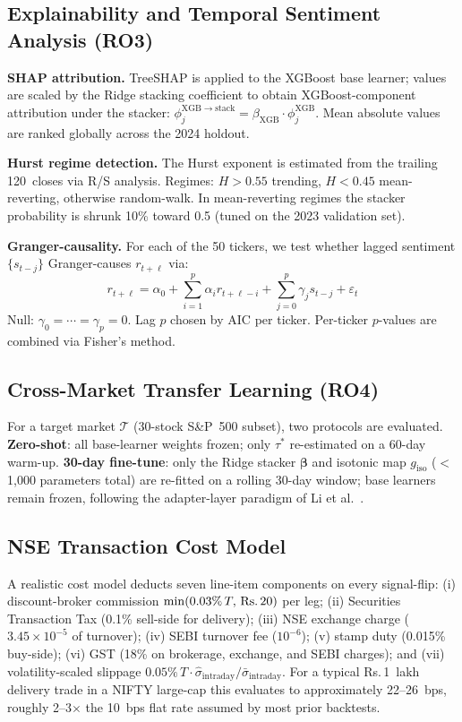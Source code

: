 \documentclass[12pt,a4paper]{article}
\begin{document}
\subsection{Explainability and Temporal Sentiment Analysis (RO3)}

\textbf{SHAP attribution.} TreeSHAP \cite{r20} is applied to the XGBoost base
learner; values are scaled by the Ridge stacking coefficient to obtain
XGBoost-component attribution under the stacker:
$\phi_j^{\mathrm{XGB}\to\mathrm{stack}}=\beta_{\mathrm{XGB}}\cdot\phi_j^{\mathrm{XGB}}$.
Mean absolute values are ranked globally across the 2024 holdout.

\textbf{Hurst regime detection.} The Hurst exponent is estimated from the
trailing 120~closes via R/S analysis. Regimes: $H>0.55$ trending, $H<0.45$
mean-reverting, otherwise random-walk. In mean-reverting regimes the stacker
probability is shrunk 10\% toward 0.5 (tuned on the 2023 validation set).

\textbf{Granger-causality.} For each of the 50 tickers, we test whether lagged
sentiment $\{s_{t-j}\}$ Granger-causes $r_{t+\ell}$ via:
\begin{equation}
r_{t+\ell}=\alpha_0+\sum_{i=1}^{p}\alpha_i r_{t+\ell-i}+\sum_{j=0}^{p}\gamma_j s_{t-j}+\varepsilon_t
\label{eq:granger}
\end{equation}
Null: $\gamma_0=\cdots=\gamma_p=0$. Lag $p$ chosen by AIC per ticker. Per-ticker
$p$-values are combined via Fisher's method.

\subsection{Cross-Market Transfer Learning (RO4)}

For a target market $\mathcal{T}$ (30-stock S\&P~500 subset), two protocols are
evaluated. \textbf{Zero-shot}: all base-learner weights frozen; only $\tau^*$
re-estimated on a 60-day warm-up. \textbf{30-day fine-tune}: only the Ridge
stacker $\boldsymbol{\beta}$ and isotonic map $g_{\mathrm{iso}}$
($<$1{,}000 parameters total) are re-fitted on a rolling 30-day window; base
learners remain frozen, following the adapter-layer paradigm of Li et al.\
\cite{r10}.

\subsection{NSE Transaction Cost Model}

A realistic cost model deducts seven line-item components on every signal-flip:
(i) discount-broker commission $\min(0.03\%\,T,\,\text{Rs.\,}20)$ per leg;
(ii) Securities Transaction Tax (0.1\% sell-side for delivery);
(iii) NSE exchange charge ($3.45\times10^{-5}$ of turnover);
(iv) SEBI turnover fee ($10^{-6}$);
(v) stamp duty (0.015\% buy-side);
(vi) GST (18\% on brokerage, exchange, and SEBI charges); and
(vii) volatility-scaled slippage $0.05\%\,T\cdot\hat\sigma_{\mathrm{intraday}}/\bar\sigma_{\mathrm{intraday}}$.
For a typical Rs.\,1~lakh delivery trade in a NIFTY large-cap this evaluates to
approximately 22--26~bps, roughly 2--3$\times$ the 10~bps flat rate assumed by
most prior backtests.
\end{document}
